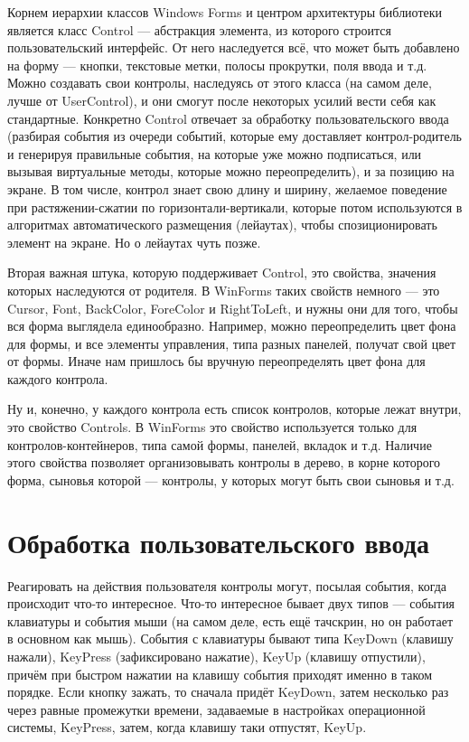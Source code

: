 \documentclass{../../text-style}
\begin{document}
Корнем  иерархии классов Windows Forms и центром архитектуры библиотеки является класс Control --- абстракция элемента, из которого строится пользовательский интерфейс. От него наследуется всё, что может быть добавлено на форму --- кнопки, текстовые метки, полосы прокрутки, поля ввода и т.д. Можно создавать свои контролы, наследуясь от этого класса (на самом деле, лучше от UserControl), и они смогут после некоторых усилий вести себя как стандартные. Конкретно Control отвечает за обработку пользовательского ввода (разбирая события из очереди событий, которые ему доставляет контрол-родитель и генерируя правильные события, на которые уже можно подписаться, или вызывая виртуальные методы, которые можно переопределить), и за позицию на экране. В том числе, контрол знает свою длину и ширину, желаемое поведение при растяжении-сжатии по горизонтали-вертикали, которые потом используются в алгоритмах автоматического размещения (лейаутах), чтобы спозиционировать элемент на экране. Но о лейаутах чуть позже.

Вторая важная штука, которую поддерживает Control, это свойства, значения которых наследуются от родителя. В WinForms таких свойств немного --- это Cursor, Font, BackColor, ForeColor и RightToLeft, и нужны они для того, чтобы вся форма выглядела единообразно. Например, можно переопределить цвет фона для формы, и все элементы управления, типа разных панелей, получат свой цвет от формы. Иначе нам пришлось бы вручную переопределять цвет фона для каждого контрола.

Ну и, конечно, у каждого контрола есть список контролов, которые лежат внутри, это свойство Controls. В WinForms это свойство используется только для контролов-контейнеров, типа самой формы, панелей, вкладок и т.д. Наличие этого свойства позволяет организовывать контролы в дерево, в корне которого форма, сыновья которой --- контролы, у которых могут быть свои сыновья и т.д.

\section{Обработка пользовательского ввода}

Реагировать на действия пользователя контролы могут, посылая события, когда происходит что-то интересное. Что-то интересное бывает двух типов --- события клавиатуры и события мыши (на самом деле, есть ещё тачскрин, но он работает в основном как мышь). События с клавиатуры бывают типа KeyDown (клавишу нажали), KeyPress (зафиксировано нажатие), KeyUp (клавишу отпустили), причём при быстром нажатии на клавишу события приходят именно в таком порядке. Если кнопку зажать, то сначала придёт KeyDown, затем несколько раз через равные промежутки времени, задаваемые в настройках операционной системы, KeyPress, затем, когда клавишу таки отпустят, KeyUp. 
\end{document}
